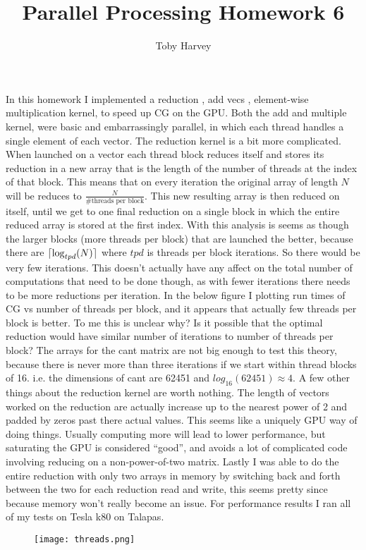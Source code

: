 \documentclass{article}
\DeclarePairedDelimiter{\ceil}{\lceil}{\rceil}
\begin{document}
\title{Parallel Processing Homework 6}
\author{Toby Harvey}
\maketitle

\noindent In this homework I implemented a reduction , add vecs , element-wise multiplication kernel, to speed up CG on the GPU. Both the add and multiple kernel, were basic and embarrassingly parallel, in which each thread handles a single element of each vector. The reduction kernel is a bit more complicated. When launched on a vector each thread block reduces itself and stores its reduction in a new array that is the length of the number of threads at the index of that block. This means that on every iteration the original array of length $N$ will be reduces to $\frac{N}{\#\text{threads per block}}$. This new resulting array is then reduced on itself, until we get to one final reduction on a single block in which the entire reduced array is stored at the first index. With this analysis is seems as though the larger blocks (more threads per block) that are launched the better, because there are $\ceil{\log_{tpd}(N)}$ where $tpd$ is threads per block iterations. So there would be very few iterations. This doesn't actually have any affect on the total number of computations that need to be done though, as with fewer iterations there needs to be more reductions per iteration. In the below figure I plotting run times of CG vs number of threads per block, and it appears that actually few threads per block is better. To me this is unclear why? Is it possible that the optimal reduction would have similar number of iterations to number of threads per block? The arrays for the cant matrix are not big enough to test this theory, because there is never more than three iterations if we start within thread blocks of 16. i.e. the dimensions of cant are 62451 and $log_{16}(62451) \approx 4$. A few other things about the reduction kernel are worth nothing. The length of vectors worked on the reduction are actually increase up to the nearest power of 2 and padded by zeros past there actual values. This seems like a uniquely GPU way of doing things. Usually computing more will lead to lower performance, but saturating the GPU is considered ``good'', and avoids a lot of complicated code involving reducing on a non-power-of-two matrix. Lastly I was able to do the entire reduction with only two arrays in memory by switching back and forth between the two for each reduction read and write, this seems pretty since because memory won't really become an issue. For performance results I ran all of my tests on Tesla k80 on Talapas.
\begin{figure}
  \texttt{[image: threads.png]}
\end{figure}
\end{document}
